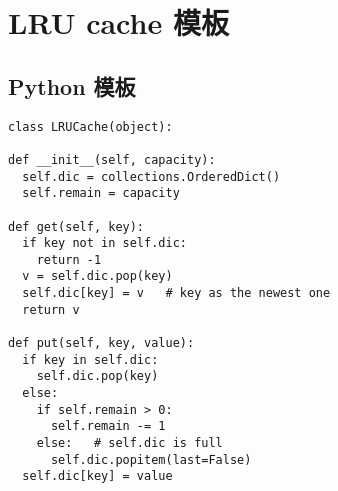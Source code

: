 \newpage
\section{LRU cache 模板}

\subsection{Python 模板}

\begin{verbatim}
class LRUCache(object):

def __init__(self, capacity):
  self.dic = collections.OrderedDict()
  self.remain = capacity

def get(self, key):
  if key not in self.dic:
    return -1
  v = self.dic.pop(key)
  self.dic[key] = v   # key as the newest one
  return v

def put(self, key, value):
  if key in self.dic:
    self.dic.pop(key)
  else:
    if self.remain > 0:
      self.remain -= 1
    else:   # self.dic is full
      self.dic.popitem(last=False)
  self.dic[key] = value
\end{verbatim}

